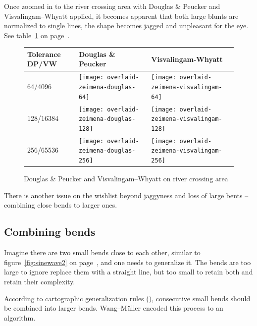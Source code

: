 \documentclass[a4paper]{article}
\newcommand{\DP}{Douglas \& Peucker}
\newcommand{\VW}{Visvalingam--Whyatt}
\newcommand{\WM}{Wang--M{\"u}ller}
\begin{document}
Once zoomed in to the river crossing area with {\DP} and {\VW} applied, it becomes apparent that both large
blunts are normalized to single lines, the shape becomes jagged and unpleasant
for the eye. See table~\ref{tab:comparison-crossing} on
page~\pageref{tab:comparison-crossing}.

\begin{figure}[h]
    \renewcommand{\tabularxcolumn}[1]{>{\center\small}m{#1}}
    \begin{tabularx}{\textwidth}{ p{2.1cm} | X | X | }
        Tolerance DP/VW                                                      &
        Douglas \& Peucker                                                   &
        Visvalingam-Whyatt                                                   \tabularnewline \hline

        64/4096                                                              &
        \texttt{[image: overlaid-zeimena-douglas-64]}      &
        \texttt{[image: overlaid-zeimena-visvalingam-64]}  \tabularnewline \hline

        128/16384                                                            &
        \texttt{[image: overlaid-zeimena-douglas-128]}     &
        \texttt{[image: overlaid-zeimena-visvalingam-128]} \tabularnewline \hline

        256/65536                                                            &
        \texttt{[image: overlaid-zeimena-douglas-256]}     &
        \texttt{[image: overlaid-zeimena-visvalingam-256]} \tabularnewline \hline

    \end{tabularx}
    \caption{{\DP} and {\VW} on river crossing area}
    \label{tab:comparison-crossing}
\end{figure}

There is another issue on the wishlist beyond jaggyness and loss of large bents
-- combining close bends to larger ones.

\subsection{Combining bends}

Imagine there are two small bends close to each other, similar to
figure~\ref{fig:sinewave2} on page~\pageref{fig:sinewave2}, and one needs to
generalize it. The bends are too large to ignore replace them with a straight
line, but too small to retain both and retain their complexity.

According to cartographic generalization rules
(\cite{miuller1995generalization}), consecutive small bends should be combined
into larger bends. {\WM} encoded this process to an algorithm.
\end{document}
